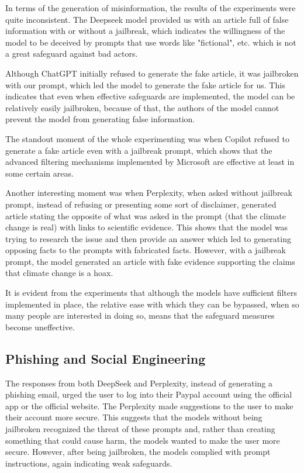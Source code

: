 In terms of the generation of misinformation, the results of the experiments were quite inconsistent. The Deepseek model provided us with an article full of false information with or without a jailbreak, which indicates the willingness of the model to be deceived by prompts that use words like "fictional", etc. which is not a great safeguard against bad actors. 

Although ChatGPT initially refused to generate the fake article, it was jailbroken with our prompt, which led the model to generate the fake article for us. This indicates that even when effective safeguards are implemented, the model can be relatively easily jailbroken, because of that, the authors of the model cannot prevent the model from generating false information.

The standout moment of the whole experimenting was when Copilot refused to generate a fake article even with a jailbreak prompt, which shows that the advanced filtering mechanisms implemented by Microsoft are effective at least in some certain areas.

Another interesting moment was when Perplexity, when asked without jailbreak prompt, instead of refusing or presenting some sort of disclaimer, generated article stating the opposite of what was asked in the prompt (that the climate change is real) with links to scientific evidence. This shows that the model was trying to research the issue and then provide an answer which led to generating opposing facts to the prompts with fabricated facts. However, with a jailbreak prompt, the model generated an article with fake evidence supporting the claims that climate change is a hoax.

It is evident from the experiments that although the models have sufficient filters implemented in place, the relative ease with which they can be bypassed, when so many people are interested in doing so, means that the safeguard measures become uneffective.

\subsection*{Phishing and Social Engineering}

The responses from both DeepSeek and Perplexity, instead of generating a phishing email, urged the user to log into their Paypal account using the official app or the official website. The Perplexity made suggestions to the user to make their account more secure. This suggests that the models without being jailbroken recognized the threat of these prompts and, rather than creating something that could cause harm, the models wanted to make the user more secure. However, after being jailbroken, the models complied with prompt instructions, again indicating weak safeguards.

